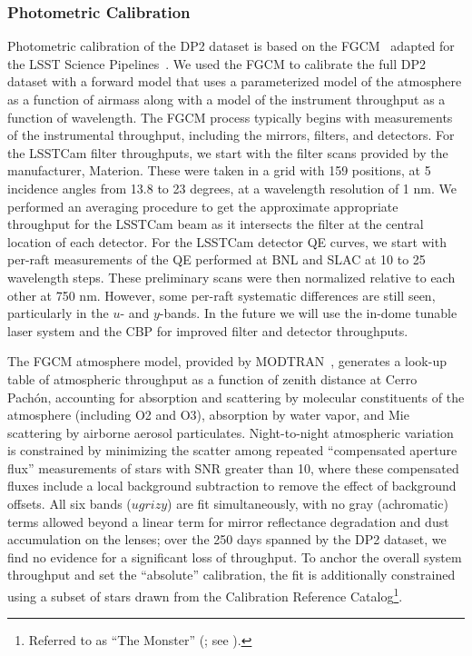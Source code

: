 \subsubsection{Photometric Calibration} \label{sec:drp-calibration-photometry}

Photometric calibration of the DP2 dataset is based on the \gls{FGCM}~\citep[][]{2018AJ....155...41B} adapted for the LSST Science Pipelines~\citep[][]{2022PASJ...74..247A, sitcomtn-086}.
We used the \gls{FGCM} to calibrate the full DP2 dataset with a forward model that uses a parameterized model of the atmosphere as a function of \gls{airmass} along with a model of the instrument throughput as a function of wavelength.
The FGCM process typically begins with measurements of the instrumental throughput, including the mirrors, filters, and detectors.
For the \gls{LSSTCam} filter throughputs, we start with the filter scans provided by the manufacturer, Materion.
These were taken in a grid with 159 positions, at 5 incidence angles from 13.8 to 23 degrees, at a wavelength resolution of 1 nm.
We performed an averaging procedure to get the approximate appropriate throughput for the \gls{LSSTCam} beam as it intersects the filter at the central location of each detector.
For the \gls{LSSTCam} detector \gls{QE} curves, we start with per-raft measurements of the QE performed at \gls{BNL} and \gls{SLAC} at 10 to 25 wavelength steps.
These preliminary scans were then normalized relative to each other at 750 nm.
However, some per-raft systematic differences are still seen, particularly in the $u$- and $y$-bands.
In the future we will use the in-dome tunable laser system and the \gls{CBP} for improved filter and detector throughputs.

The FGCM atmosphere model, provided by MODTRAN~\citep[][]{1999SPIE.3756..348B}, generates a look-up table of atmospheric throughput as a function of zenith distance at Cerro Pach\'on, accounting for absorption and scattering by molecular constituents of the atmosphere (including O2 and O3), absorption by water vapor, and Mie scattering by airborne aerosol particulates.
Night-to-night atmospheric variation is constrained by minimizing the scatter among repeated ``compensated aperture \gls{flux}'' measurements of stars with \gls{SNR} greater than 10, where these compensated fluxes include a local \gls{background} subtraction to remove the effect of \gls{background} offsets.
All six bands ($ugrizy$) are fit simultaneously, with no gray (achromatic) terms allowed beyond a linear term for mirror reflectance degradation and dust accumulation on the lenses; over the 250 days spanned by the \gls{DP2} dataset, we find no evidence for a significant loss of throughput.
To anchor the overall system throughput and set the ``absolute'' calibration, the fit is additionally constrained using a subset of stars drawn from the Calibration Reference Catalog\footnote{Referred to as ``The Monster'' (; see \citealt[][]{DMTN-277}).}.

